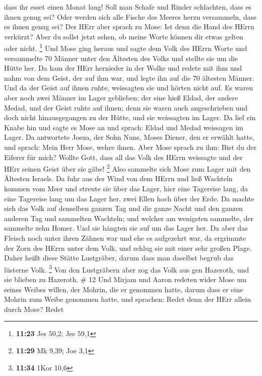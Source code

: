 dass ihr esset einen Monat lang!  Soll man Schafe und
Rinder schlachten, dass es ihnen genug sei? Oder werden sich alle Fische
des Meeres herzu versammeln, dass es ihnen genug sei?  Der
HErr aber sprach zu Mose: Ist denn die Hand des HErrn verkürzt? Aber du
sollst jetzt sehen, ob meine Worte können dir etwas gelten oder nicht.
\footnote{\textbf{11:23} Jes 50,2; Jes 59,1}  Und Mose ging
heraus und sagte dem Volk des HErrn Worte und versammelte 70 Männer
unter den Ältesten des Volks und stellte sie um die Hütte her.
 Da kam der HErr hernieder in der Wolke und redete mit ihm
und nahm von dem Geist, der auf ihm war, und legte ihn auf die 70
ältesten Männer. Und da der Geist auf ihnen ruhte, weissagten sie und
hörten nicht auf.  Es waren aber noch zwei Männer im Lager
geblieben; der eine hieß Eldad, der andere Medad, und der Geist ruhte
auf ihnen; denn sie waren auch angeschrieben und doch nicht
hinausgegangen zu der Hütte, und sie weissagten im Lager. 
Da lief ein Knabe hin und sagte es Mose an und sprach: Eldad und Medad
weissagen im Lager.  Da antwortete Josua, der Sohn Nuns,
Moses Diener, den er erwählt hatte, und sprach: Mein Herr Mose, wehre
ihnen.  Aber Mose sprach zu ihm: Bist du der Eiferer für
mich? Wollte Gott, dass all das Volk des HErrn weissagte und der HErr
seinen Geist über sie gäbe! \footnote{\textbf{11:29} Mk 9,39; Joe 3,1}
 Also sammelte sich Mose zum Lager mit den Ältesten
Israels.  Da fuhr aus der Wind von dem HErrn und ließ
Wachteln kommen vom Meer und streute sie über das Lager, hier eine
Tagereise lang, da eine Tagereise lang um das Lager her, zwei Ellen hoch
über der Erde.  Da machte sich das Volk auf denselben
ganzen Tag und die ganze Nacht und den ganzen anderen Tag und sammelten
Wachteln; und welcher am wenigsten sammelte, der sammelte zehn Homer.
Und sie hängten sie auf um das Lager her.  Da aber das
Fleisch noch unter ihren Zähnen war und ehe es aufgezehrt war, da
ergrimmte der Zorn des HErrn unter dem Volk, und schlug sie mit einer
sehr großen Plage.  Daher heißt diese Stätte Lustgräber,
darum dass man daselbst begrub das lüsterne Volk. \footnote{\textbf{11:34}
  1Kor 10,6}  Von den Lustgräbern aber zog das Volk aus gen
Hazeroth, und sie blieben zu Hazeroth. \# 12  Und Mirjam und
Aaron redeten wider Mose um seines Weibes willen, der Mohrin, die er
genommen hatte, darum dass er eine Mohrin zum Weibe genommen hatte,
 und sprachen: Redet denn der HErr allein durch Mose? Redet
